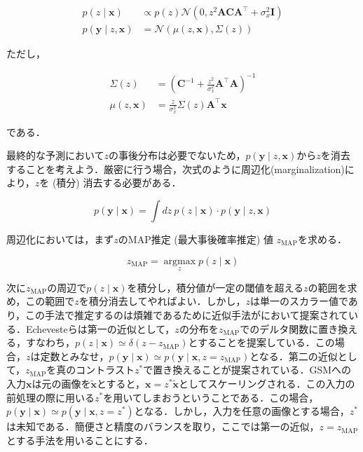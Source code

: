 \begin{align}
p(z \mid \mathbf{x}) &\propto p(z) \mathcal{N}\left(0, z^{2} \mathbf{A C A}^{\top}+\sigma_{x}^{2} \mathbf{I}\right)\\
p(\mathbf{y} \mid z, \mathbf{x})& = \mathcal{N}\left(\mu(z, \mathbf{x}), \Sigma(z)\right)
\end{align}


ただし，


\begin{align}
\Sigma(z)&=\left(\mathbf{C}^{-1}+\frac{z^{2}}{\sigma_{x}^{2}} \mathbf{A}^{\top} \mathbf{A}\right)^{-1}\\
\mu(z, \mathbf{x})&=\frac{z}{\sigma_{x}^{2}} \Sigma(z) \mathbf{A}^{\top} \mathbf{x}
\end{align}


である．

最終的な予測において$z$の事後分布は必要でないため，$p(\mathbf{y} \mid z, \mathbf{x})$から$z$を消去することを考えよう．厳密に行う場合，次式のように周辺化(marginalization)により，$z$を (積分) 消去する必要がある．


\begin{equation}
p(\mathbf{y} \mid \mathbf{x}) = \int dz\ p(z\mid \mathbf{x})\cdot p(\mathbf{y} \mid z, \mathbf{x})
\end{equation}


周辺化においては，まず$z$のMAP推定 (最大事後確率推定) 値 $z_{\mathrm{MAP}}$を求める．


\begin{equation}
z_{\mathrm{MAP}} = \underset{z}{\operatorname{argmax}} p(z\mid \mathbf{x})
\end{equation}


次に$z_{\mathrm{MAP}}$の周辺で$p(z\mid \mathbf{x})$を積分し，積分値が一定の閾値を超える$z$の範囲を求め，この範囲で$z$を積分消去してやればよい．しかし，$z$は単一のスカラー値であり，この手法で推定するのは煩雑であるために近似手法が\citep{Echeveste2017-wu}において提案されている．Echevesteらは第一の近似として，$z$の分布を$z_{\mathrm{MAP}}$でのデルタ関数に置き換える，すなわち，$p(z\mid \mathbf{x})\simeq \delta (z-z_{\mathrm{MAP}})$とすることを提案している．この場合，$z$は定数とみなせ，$p(\mathbf{y} \mid \mathbf{x})\simeq p(\mathbf{y} \mid \mathbf{x}, z=z_{\mathrm{MAP}})$となる．第二の近似として，$z_{\mathrm{MAP}}$を真のコントラスト$z^*$で置き換えることが提案されている．GSMへの入力$\mathbf{x}$は元の画像を$\mathbf{\tilde x}$とすると，$\mathbf{x}=z^* \mathbf{\tilde x}$としてスケーリングされる．この入力の前処理の際に用いる$z^*$を用いてしまおうということである．この場合，$p(\mathbf{y} \mid \mathbf{x})\simeq p(\mathbf{y} \mid \mathbf{x}, z=z^*)$となる．しかし，入力を任意の画像とする場合，$z^*$は未知である．簡便さと精度のバランスを取り，ここでは第一の近似，$z=z_{\mathrm{MAP}}$とする手法を用いることにする．


